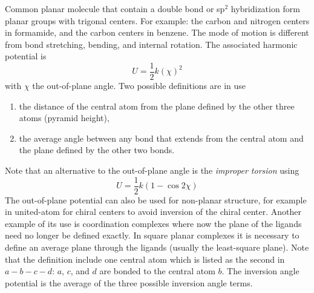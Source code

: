 Common planar molecule that contain a double bond or sp$^2$ hybridization form planar groups with trigonal centers.
For example: the carbon and nitrogen centers in formamide, and the carbon centers in benzene.
The mode of motion is different from bond stretching, bending, and internal rotation.
The associated harmonic potential is
\begin{equation}
  U=\frac{1}{2} k \left(\chi\right)^2
\end{equation}
with $\chi$ the out-of-plane angle. Two possible definitions are in use
\begin{enumerate}
\item{the distance of the central atom from the plane defined by the other three atoms (pyramid height),}
\item{the average angle between any bond that extends from the central atom and the plane defined by the
other two bonds}.
\end{enumerate}
Note that an alternative to the out-of-plane angle is the \emph{improper torsion} using
\begin{equation}
  U=\frac{1}{2} k \left(1-\cos 2\chi\right)
\end{equation}
The out-of-plane potential can also be used for non-planar structure, for example in united-atom for chiral
centers to avoid inversion of the chiral center. Another example of its use is coordination complexes
where now the plane of the ligands need no longer be defined exactly.
In square planar complexes it is necessary to define an average plane through the ligands
(usually the least-square plane).
Note that the definition include one central atom
which is listed as the second in $a-b-c-d$: $a$, $c$, and $d$ are bonded to the central atom $b$.
The inversion angle potential is the average of the three possible inversion angle terms.

